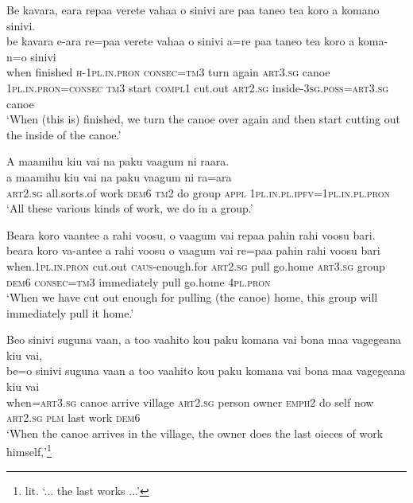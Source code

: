 \ea\label{ex:text16-22}
Be kavara, eara repaa verete vahaa o sinivi are paa taneo tea koro a komano sinivi.\\
\gll be	kavara	e-ara	re=paa	verete	vahaa	o	sinivi	a=re	paa	taneo	tea	koro	a	koma-n=o	sinivi\\
     when	finished	\textsc{h}-1\textsc{pl}.\textsc{in}.\textsc{pron}	\textsc{consec}=\textsc{tm}3	turn	again	\textsc{art}3.\textsc{sg}	canoe	1\textsc{pl}.\textsc{in}.\textsc{pron}=\textsc{consec}	\textsc{tm}3	start	\textsc{compl}1	cut.out	\textsc{art}2.\textsc{sg}	inside-3\textsc{sg}.\textsc{poss}=\textsc{art}3.\textsc{sg}	canoe\\
\glt `When (this is) finished, we turn the canoe over again and then start cutting out the inside of the canoe.'
\z

\ea\label{ex:text16-23}
A maamihu kiu vai na paku vaagum ni raara.\\
\gll a	maamihu	kiu	vai	na	paku	vaagum	ni	ra=ara\\
     \textsc{art}2.\textsc{sg}	all.sorts.of	work	\textsc{dem}6	\textsc{tm}2	do	group	\textsc{appl}	1\textsc{pl}.\textsc{in}.\textsc{pl}.\textsc{ipfv}=1\textsc{pl}.\textsc{in}.\textsc{pl}.\textsc{pron}\\
\glt `All these various kinds of work, we do in a group.'
\z

\ea\label{ex:text16-24}
Beara koro vaantee a rahi voosu, o vaagum vai repaa pahin rahi voosu bari.\\
\gll beara	koro	va-antee	a	rahi	voosu	o	vaagum	vai	re=paa	pahin	rahi	voosu	bari\\
     when.1\textsc{pl}.\textsc{in}.\textsc{pron}	cut.out	\textsc{caus}-enough.for	\textsc{art}2.\textsc{sg}	pull	go.home	\textsc{art}3.\textsc{sg}	group	\textsc{dem}6	\textsc{consec}=\textsc{tm}3	immediately	pull	go.home	4\textsc{pl}.\textsc{pron}\\
\glt `When we have cut out enough for pulling (the canoe) home, this group will immediately pull it home.'
\z

\ea\label{ex:text16-25}
Beo sinivi suguna vaan, a too vaahito kou paku komana vai bona maa vagegeana kiu vai,\\
\gll be=o	sinivi	suguna	vaan	a	too	vaahito	kou	paku	komana	vai	bona	maa	vagegeana	kiu	vai\\
     when=\textsc{art}3.\textsc{sg}	canoe	arrive	village	\textsc{art}2.\textsc{sg}	person	owner	\textsc{emph}2	do	self	now	\textsc{art}2.\textsc{sg}	\textsc{plm}	last	work	\textsc{dem}6\\
\glt `When the canoe arrives in the village, the owner does the last oieces of work himself,'\footnote{lit. `... the last works ...'}
\z


